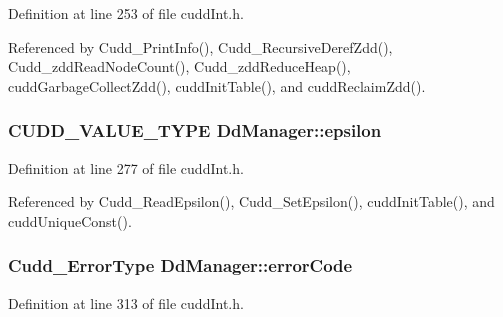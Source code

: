 Definition at line 253 of file cudd\-Int.h.

Referenced by Cudd\_\-Print\-Info(), Cudd\_\-Recursive\-Deref\-Zdd(), Cudd\_\-zdd\-Read\-Node\-Count(), Cudd\_\-zdd\-Reduce\-Heap(), cudd\-Garbage\-Collect\-Zdd(), cudd\-Init\-Table(), and cudd\-Reclaim\-Zdd().
\subsubsection{\setlength{\rightskip}{0pt plus 5cm}CUDD\_\-VALUE\_\-TYPE \bf{Dd\-Manager::epsilon}}\label{structDdManager_d495ea9a4104c2be5b4ca850a1da8c28}




Definition at line 277 of file cudd\-Int.h.

Referenced by Cudd\_\-Read\-Epsilon(), Cudd\_\-Set\-Epsilon(), cudd\-Init\-Table(), and cudd\-Unique\-Const().
\subsubsection{\setlength{\rightskip}{0pt plus 5cm}\bf{Cudd\_\-Error\-Type} \bf{Dd\-Manager::error\-Code}}\label{structDdManager_e0690f123fc2c3f0ca9a1cfd18923a37}




Definition at line 313 of file cudd\-Int.h.

